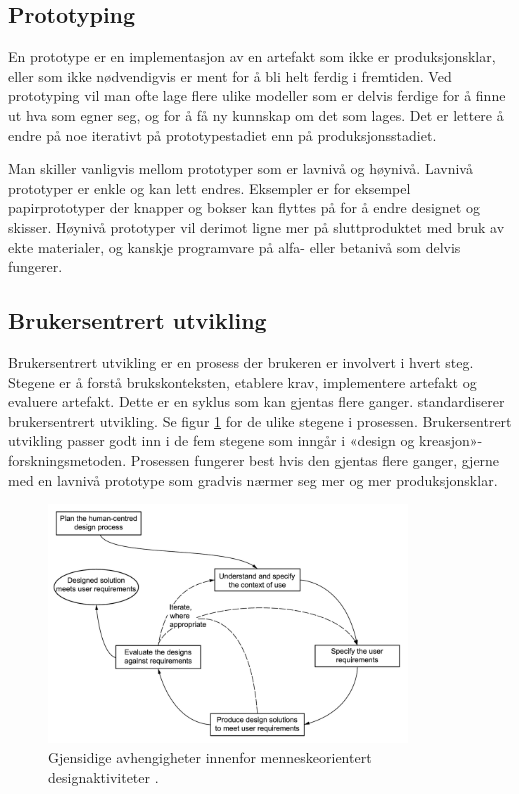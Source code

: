 \subsection{Prototyping}
En prototype er en implementasjon av en artefakt som ikke er produksjonsklar, eller som ikke nødvendigvis er ment for å
bli helt ferdig i fremtiden. Ved prototyping vil man ofte lage flere ulike modeller som er delvis ferdige
for å finne ut hva som egner seg, og for å få ny kunnskap om det som lages. Det er lettere å endre på noe iterativt
på prototypestadiet enn på produksjonsstadiet.

Man skiller vanligvis mellom prototyper som er lavnivå og høynivå. Lavnivå prototyper er enkle og kan lett endres.
Eksempler er for eksempel papirprototyper der knapper og bokser kan flyttes på for å endre designet og skisser.
Høynivå prototyper vil derimot ligne mer på sluttproduktet med bruk av ekte materialer, og kanskje programvare
på alfa- eller betanivå som delvis fungerer.

\subsection{Brukersentrert utvikling}
Brukersentrert utvikling er en prosess der brukeren er involvert i hvert steg.
Stegene er å forstå brukskonteksten, etablere krav, implementere artefakt og evaluere artefakt. Dette er en syklus som kan gjentas flere ganger.
\citet{dis20099241} standardiserer brukersentrert utvikling. Se figur \ref{fig:iso9241-210}
for de ulike stegene i prosessen.
Brukersentrert utvikling passer godt inn i de fem stegene som inngår i «design og kreasjon»-forskningsmetoden. Prosessen fungerer best hvis den gjentas
flere ganger, gjerne med en lavnivå prototype som gradvis nærmer seg mer og mer produksjonsklar.

\begin{figure}
\centering
\includegraphics[width=0.85\textwidth]{fig/iso9241-210}
\caption{Gjensidige avhengigheter innenfor menneskeorientert designaktiviteter \citep{dis20099241}.}
\label{fig:iso9241-210}
\end{figure}

